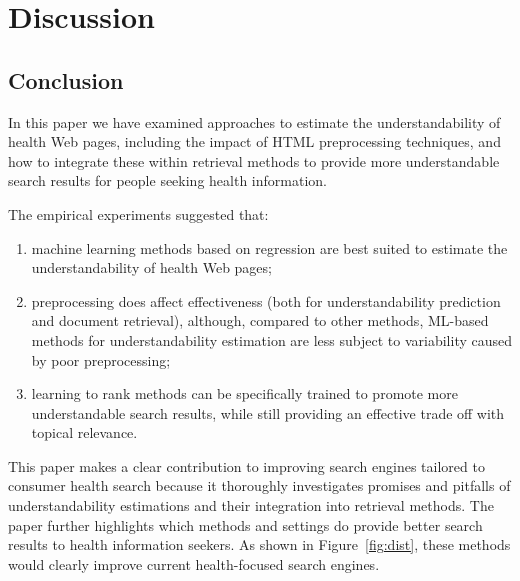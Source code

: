 
\section*{Discussion}


\subsection*{Conclusion}
\label{sec:conclusion_doc_analysis}

In this paper we have examined approaches to estimate the understandability of health Web pages, including the impact of HTML preprocessing techniques, and how to integrate these within retrieval methods to provide more understandable search results for people seeking health information. 


The empirical experiments suggested that:

\vspace{-4pt}
\begin{enumerate}[leftmargin=*]
	\item machine learning methods based on regression are best suited to estimate the understandability of health Web pages;
	\item preprocessing does affect effectiveness (both for understandability prediction and document retrieval), although, compared to other methods, ML-based methods for understandability estimation are less subject to variability caused by poor preprocessing;
	\item learning to rank methods can be specifically trained to promote more understandable search results, while still providing an effective trade off with topical relevance.
\end{enumerate} 

This paper makes a clear contribution to improving search engines tailored to consumer health search because it thoroughly investigates promises and pitfalls of understandability estimations and their integration into retrieval methods. The paper further highlights which methods and settings do provide better search results to health information seekers. As shown in Figure~\ref{fig:dist}, these methods would clearly improve current health-focused search engines. 


